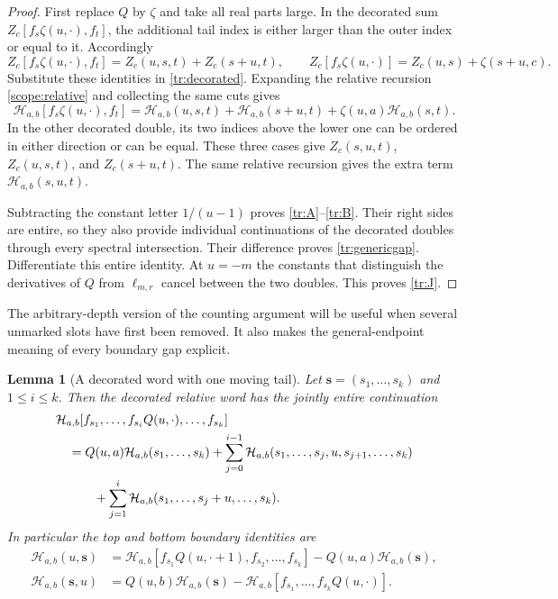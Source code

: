 \documentclass[11pt,letterpaper]{article}
\numberwithin{equation}{section}
\theoremstyle{plain}
\newtheorem{lemma}[theorem]{Lemma}
\theoremstyle{definition}
\theoremstyle{remark}
\newcommand{\HH}{\mathcal H}
\begin{document}
\begin{proof}
First replace $Q$ by $\zeta$ and take all real parts large.
In the decorated sum $Z_c[f_s\zeta(u,\cdot),f_t]$, the additional
tail index is either larger than the outer index or equal to it.
Accordingly
\[
 Z_c[f_s\zeta(u,\cdot),f_t]
          =Z_c(u,s,t)+Z_c(s+u,t),
 \qquad
 Z_c[f_s\zeta(u,\cdot)]=Z_c(u,s)+\zeta(s+u,c).
\]
Substitute these identities in \eqref{tr:decorated}. Expanding the
relative recursion \eqref{scope:relative} and collecting the same cuts
gives
\[
 \HH_{a,b}[f_s\zeta(u,\cdot),f_t]
   =\HH_{a,b}(u,s,t)+\HH_{a,b}(s+u,t)
                            +\zeta(u,a)\HH_{a,b}(s,t).
\]
In the other decorated double, its two indices above the lower one
can be ordered in either direction or can be equal. These three cases
give $Z_c(s,u,t)$, $Z_c(u,s,t)$, and $Z_c(s+u,t)$.
The same relative recursion gives the extra term $\HH_{a,b}(s,u,t)$.

Subtracting the constant letter $1/(u-1)$ proves
\eqref{tr:A}--\eqref{tr:B}. Their right sides are entire, so they also
provide individual continuations of the decorated doubles through every
spectral intersection. Their difference proves \eqref{tr:genericgap}.
Differentiate this entire identity. At $u=-m$ the constants that
distinguish the derivatives of $Q$ from $\ell_{m,r}$ cancel between
the two doubles. This proves \eqref{tr:J}.
\end{proof}

The arbitrary-depth version of the counting argument will be useful
when several unmarked slots have first been removed. It also makes the
general-endpoint meaning of every boundary gap explicit.

\begin{lemma}[A decorated word with one moving tail]
\label{tr:masterlemma}
Let $\boldsymbol s=(s_1,\ldots,s_k)$ and $1\leq i\leq k$.
Then the decorated relative word has the jointly entire continuation
\begin{align}
 &\HH_{a,b}[f_{s_1},\ldots,f_{s_i}Q(u,\cdot),\ldots,f_{s_k}]
 \notag\\
 &\quad=Q(u,a)\HH_{a,b}(s_1,\ldots,s_k)
   +\sum_{j=0}^{i-1}\HH_{a,b}(s_1,\ldots,s_j,u,s_{j+1},\ldots,s_k)
 \notag\\
 &\qquad\quad
   +\sum_{j=1}^{i}\HH_{a,b}(s_1,\ldots,s_j+u,\ldots,s_k).
 \label{tr:masterdecorate}
\end{align}
In particular the top and bottom boundary identities are
\begin{align}
 \HH_{a,b}(u,\boldsymbol s)
  &=\HH_{a,b}[f_{s_1}Q(u,\cdot+1),f_{s_2},\ldots,f_{s_k}]
                      -Q(u,a)\HH_{a,b}(\boldsymbol s),
 \label{tr:topgap}\\
 \HH_{a,b}(\boldsymbol s,u)
  &=Q(u,b)\HH_{a,b}(\boldsymbol s)
      -\HH_{a,b}[f_{s_1},\ldots,f_{s_k}Q(u,\cdot)].
 \label{tr:bottomgap}
\end{align}
\end{lemma}
\end{document}
